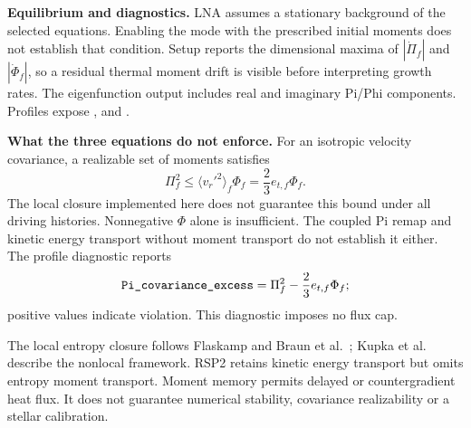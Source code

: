 \documentclass[11pt]{article}
\newcommand{\code}[1]{\texttt{\detokenize{#1}}}
\numberwithin{equation}{section}
\begin{document}
\textbf{Equilibrium and diagnostics.}
LNA assumes a stationary background of the selected equations.
Enabling the mode with the prescribed initial moments does not establish that
condition. Setup reports the dimensional maxima of
$|\dot\Pi_f|$ and $|\dot\Phi_f|$, so a residual thermal moment drift is
visible before interpreting growth rates.
The eigenfunction output includes real and imaginary Pi/Phi components.
Profiles expose \code{Pi}, \code{Phi} and \code{Pi_covariance_excess}.

\textbf{What the three equations do not enforce.}
For an isotropic velocity covariance, a realizable set of moments satisfies
\begin{equation}
 \Pi_f^2\leq \langle v_r'^2\rangle_f\Phi_f
             =\frac23 e_{t,f}\Phi_f .
 \label{eq:realizability}
\end{equation}
The local closure implemented here does not guarantee this bound under
all driving histories. Nonnegative $\Phi$ alone is insufficient.
The coupled Pi remap and kinetic energy transport without moment
transport do not establish it either.
The profile diagnostic reports
\begin{equation}
 \code{Pi_covariance_excess}=\Pi_f^2-\frac23e_{t,f}\Phi_f ;
\end{equation}
positive values indicate violation. This diagnostic imposes no flux cap.

The local entropy closure follows Flaskamp and Braun et al.~\cite{flaskamp,braun};
Kupka et al.~\cite{kupka} describe the nonlocal framework.
RSP2 retains kinetic energy transport but omits entropy moment transport.
Moment memory permits delayed or countergradient heat flux. It does not
guarantee numerical stability, covariance realizability or a stellar calibration.

\clearpage
\end{document}
